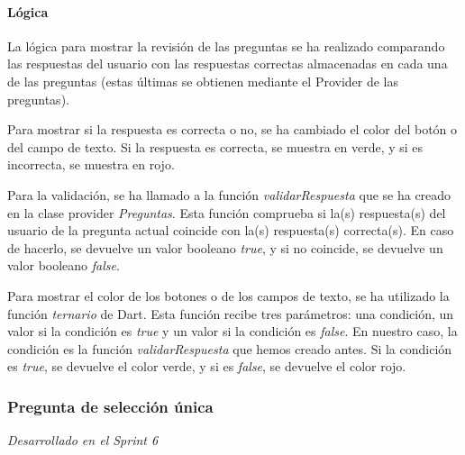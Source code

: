 \paragraph*{Lógica}
\label{sec:logica}
La lógica para mostrar la revisión de las preguntas se ha realizado comparando las respuestas del usuario con las respuestas correctas almacenadas en cada una de las preguntas (estas últimas se obtienen mediante el Provider de las preguntas).

Para mostrar si la respuesta es correcta o no, se ha cambiado el color del botón o del campo de texto. Si la respuesta es correcta, se muestra en verde, y si es incorrecta, se muestra en rojo. 

Para la validación, se ha llamado a la función \textit{validarRespuesta} que se ha creado en la clase provider \textit{Preguntas}. Esta función comprueba si la(s) respuesta(s) del usuario de la pregunta actual coincide con la(s) respuesta(s) correcta(s). En caso de hacerlo, se devuelve un valor booleano \textit{true}, y si no coincide, se devuelve un valor booleano \textit{false}.

Para mostrar el color de los botones o de los campos de texto, se ha utilizado la función \textit{ternario} de Dart. Esta función recibe tres parámetros: una condición, un valor si la condición es \textit{true} y un valor si la condición es \textit{false}. En nuestro caso, la condición es la función \textit{validarRespuesta} que hemos creado antes. Si la condición es \textit{true}, se devuelve el color verde, y si es \textit{false}, se devuelve el color rojo.

\newpage

\subsubsection{Pregunta de selección única}
\label{sec:pregunic1b}
\textit{Desarrollado en el Sprint 6}

